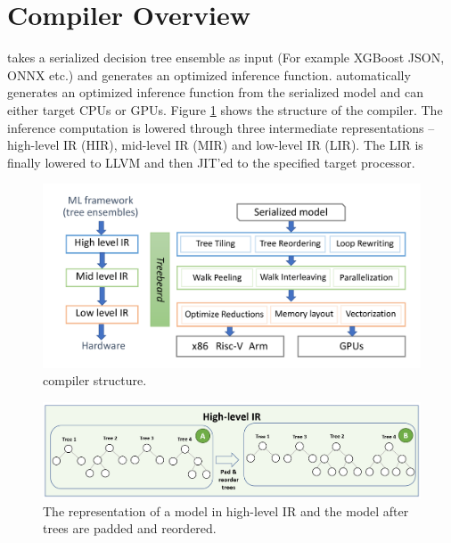 \section{Compiler Overview}
\label{Sec:Overview}
\Treebeard{} takes a serialized decision tree ensemble as input (For example
XGBoost JSON, ONNX etc.) and generates an optimized inference function. 
\Treebeard{} automatically generates an optimized inference function from 
the serialized model and can either target CPUs or GPUs. 
Figure \ref{Fig:CompilerStructure} shows the structure of the \Treebeard{} compiler. 
The inference computation is lowered through three intermediate representations
-- high-level IR (HIR), mid-level IR (MIR) and low-level IR (LIR). The LIR is
finally lowered to LLVM and then JIT'ed to the specified target processor.

\begin{figure}[htb]
  \centering
  \includegraphics[width=\linewidth]{figures/compiler.png}
  \caption{\Treebeard{} compiler structure.}
  \label{Fig:CompilerStructure}
\end{figure}

\begin{figure}[htb]
  \centering
  \includegraphics[width=\linewidth]{figures/HIR.PNG}
  \caption{The representation of a model in high-level IR and the model 
  after trees are padded and reordered. }
  \label{Fig:HIRExample}
\end{figure}

